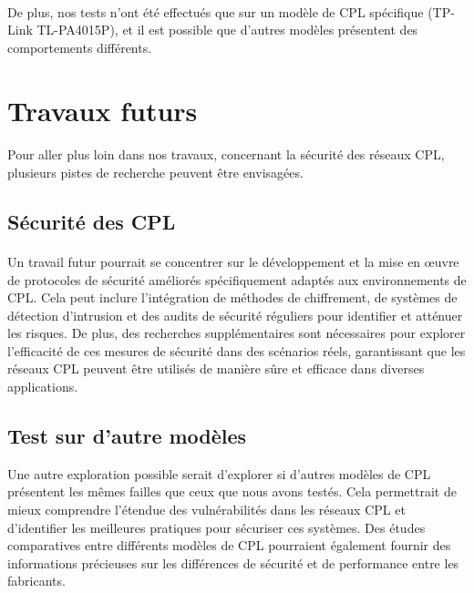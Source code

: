 \documentclass[a4paper,twocolumn]{report}
\begin{document}
\paragraph{}De plus, nos tests n'ont été effectués que sur un modèle de CPL spécifique
(TP-Link TL-PA4015P), et il est possible que d'autres modèles présentent des comportements différents.

\section{Travaux futurs}
\paragraph{}Pour aller plus loin dans nos travaux, concernant la sécurité des réseaux CPL, plusieurs pistes de recherche peuvent être envisagées.
\subsection{Sécurité des CPL}
\paragraph{}Un travail futur pourrait se concentrer sur le développement et la mise en œuvre
de protocoles de sécurité améliorés spécifiquement adaptés aux environnements de CPL.
Cela peut inclure l'intégration de méthodes de chiffrement, de systèmes de détection
d'intrusion et des audits de sécurité réguliers pour identifier et atténuer les risques.
De plus, des recherches supplémentaires sont nécessaires pour explorer l'efficacité de
ces mesures de sécurité dans des scénarios réels, garantissant que les réseaux CPL
peuvent être utilisés de manière sûre et efficace dans diverses applications.
\subsection{Test sur d'autre modèles}Une autre exploration possible serait d'explorer si d'autres modèles de CPL
présentent les mêmes failles que ceux que nous avons testés. Cela permettrait de
mieux comprendre l'étendue des vulnérabilités dans les réseaux CPL et d'identifier
les meilleures pratiques pour sécuriser ces systèmes. Des études comparatives entre
différents modèles de CPL pourraient également fournir des informations précieuses
sur les différences de sécurité et de performance entre les fabricants.
\end{document}
